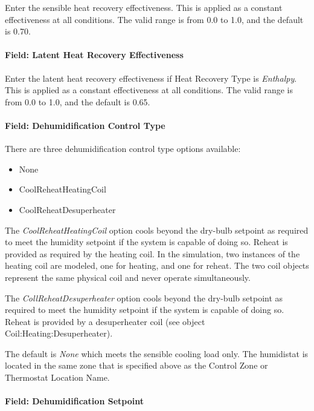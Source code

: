 Enter the sensible heat recovery effectiveness. This is applied as a constant effectiveness at all conditions. The valid range is from 0.0 to 1.0, and the default is 0.70.

\paragraph{Field: Latent Heat Recovery Effectiveness}\label{field-latent-heat-recovery-effectiveness-1}

Enter the latent heat recovery effectiveness if Heat Recovery Type is \emph{Enthalpy}. This is applied as a constant effectiveness at all conditions. The valid range is from 0.0 to 1.0, and the default is 0.65.

\paragraph{Field: Dehumidification Control Type}\label{field-dehumidification-control-type-1}

There are three dehumidification control type options available:

\begin{itemize}
\item
  None
\item
  CoolReheatHeatingCoil
\item
  CoolReheatDesuperheater
\end{itemize}

The \emph{CoolReheatHeatingCoil} option cools beyond the dry-bulb setpoint as required to meet the humidity setpoint if the system is capable of doing so. Reheat is provided as required by the heating coil. In the simulation, two instances of the heating coil are modeled, one for heating, and one for reheat. The two coil objects represent the same physical coil and never operate simultaneously.

The \emph{CollReheatDesuperheater} option cools beyond the dry-bulb setpoint as required to meet the humidity setpoint if the system is capable of doing so. Reheat is provided by a desuperheater coil (see object Coil:Heating:Desuperheater).

The default is \emph{None} which meets the sensible cooling load only. The humidistat is located in the same zone that is specified above as the Control Zone or Thermostat Location Name.

\paragraph{Field: Dehumidification Setpoint}\label{field-dehumidification-setpoint-1}


